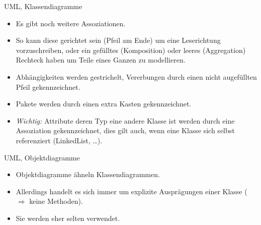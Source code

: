 \begin{frame}{UML, Klassendiagramme}
    \begin{itemize}[<+(1)->]
        \item Es gibt noch weitere Assoziationen.
        \item So kann diese gerichtet sein (Pfeil am Ende) um eine Leserichtung vorzuschreiben,\pause{} oder ein gefülltes (Komposition) oder leeres (Aggregation) Rechteck haben um Teile eines Ganzen zu modellieren.
        \item Abhängigkeiten werden gestrichelt, Vererbungen durch einen nicht augefüllten Pfeil gekennzeichnet.
        \item Pakete werden durch einen extra Kasten gekennzeichnet.
        \item \textit{Wichtig:} Attribute deren Typ eine andere Klasse ist werden durch eine Assoziation gekennzeichnet,\pause{} dies gilt auch, wenn eine Klasse sich selbst referenziert\pause{} (LinkedList, \ldots).
    \end{itemize}
\end{frame}

\begin{frame}{UML, Objektdiagramme}
    \begin{itemize}[<+(1)->]
        \item Objektdiagramme ähneln Klassendiagrammen.
        \item Allerdings handelt es sich immer um explizite Ausprägungen einer Klasse\pause{} (\(\Rightarrow\) keine Methoden).
        \item Sie werden eher selten verwendet.
    \end{itemize}
    \vfill\pause{}
    \begin{center}
    \end{center}\vfill\hbox{}
\end{frame}

